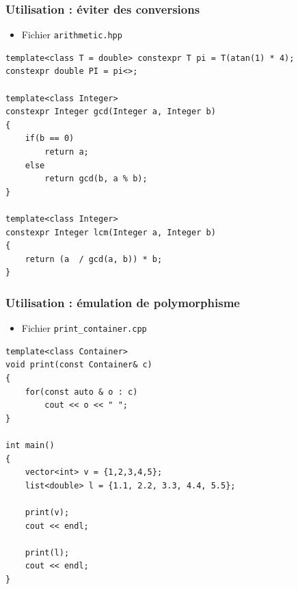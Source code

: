 \begin{frame}[containsverbatim]
\frametitle{Utilisation : éviter des conversions}
\begin{itemize}
\item Fichier \texttt{arithmetic.hpp}
\end{itemize}
\begin{lstlisting}
template<class T = double> constexpr T pi = T(atan(1) * 4);
constexpr double PI = pi<>;

template<class Integer>
constexpr Integer gcd(Integer a, Integer b)
{    
    if(b == 0)
        return a;
    else
        return gcd(b, a % b);
}

template<class Integer>
constexpr Integer lcm(Integer a, Integer b)
{
    return (a  / gcd(a, b)) * b; 
}
\end{lstlisting}
\end{frame}

\begin{frame}[containsverbatim]
\frametitle{Utilisation : émulation de polymorphisme}
\begin{itemize}
\item Fichier \texttt{print\_container.cpp}
\end{itemize}
\begin{lstlisting}
template<class Container>
void print(const Container& c)
{
	for(const auto & o : c)
		cout << o << " ";
}

int main()
{
	vector<int> v = {1,2,3,4,5};
	list<double> l = {1.1, 2.2, 3.3, 4.4, 5.5};

	print(v);
	cout << endl;

	print(l);
	cout << endl;
}
\end{lstlisting}
\end{frame}

